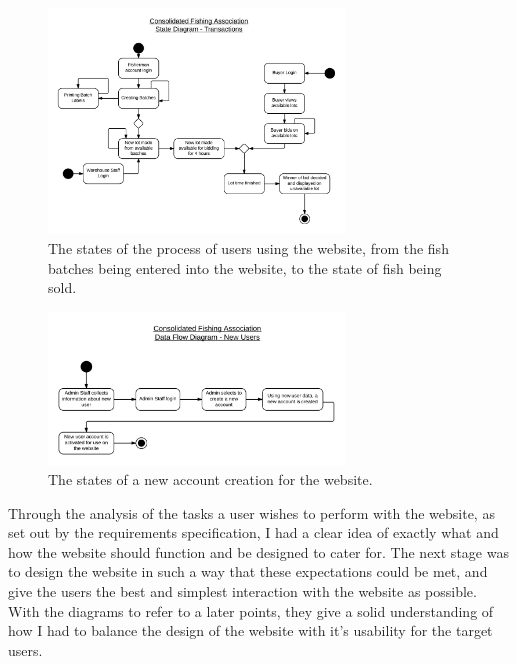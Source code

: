 \documentclass{article}
\begin{document}
\begin{figure}[H]
	\centering
	\includegraphics[width=0.7\textwidth]{img/TA-SD-Batches.png}
	\caption{The states of the process of users using the website, from the fish batches being entered into the website, to the state of fish being sold.}
\end{figure}

\begin{figure}[H]
	\centering
	\includegraphics[width=0.7\textwidth]{img/TA-SD-Users.png}
	\caption{The states of a new account creation for the website.}
\end{figure}

Through the analysis of the tasks a user wishes to perform with the website, as set out by the requirements specification, I had a clear idea of exactly what and how the website should function and be designed to cater for. The next stage was to design the website in such a way that these expectations could be met, and give the users the best and simplest interaction with the website as possible. With the diagrams to refer to a later points, they give a solid understanding of how I had to balance the design of the website with it's usability for the target users.

\end{document}

